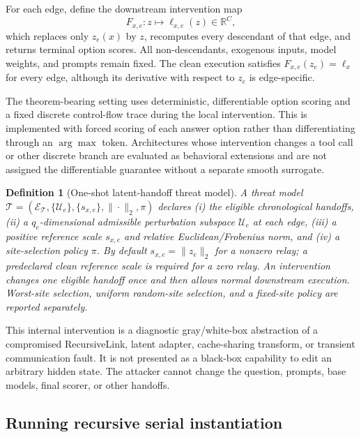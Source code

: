 \documentclass[11pt]{article}
\newtheorem{definition}[theorem]{Definition}
\newcommand{\R}{\mathbb R}
\newcommand{\threat}{\mathcal T}
\begin{document}
For each edge, define the downstream intervention map
\begin{equation}
    F_{x,e}:z\longmapsto \ell_{x,e}(z)\in\R^C,
    \label{eq:intervention-map}
\end{equation}
which replaces only \(z_e(x)\) by \(z\), recomputes every descendant of that
edge, and returns terminal option scores. All non-descendants, exogenous inputs,
model weights, and prompts remain fixed. The clean execution satisfies
\(F_{x,e}(z_e)=\ell_x\) for every edge, although its derivative with respect to
\(z_e\) is edge-specific.

The theorem-bearing setting uses deterministic, differentiable option scoring
and a fixed discrete control-flow trace during the local intervention. This is
implemented with forced scoring of each answer option rather than differentiating
through an \(\arg\max\) token. Architectures whose intervention changes a tool
call or other discrete branch are evaluated as behavioral extensions and are
not assigned the differentiable guarantee without a separate smooth surrogate.

\begin{definition}[One-shot latent-handoff threat model]
\label{def:threat-model}
A threat model
\(\threat=(\mathcal E_{\threat},\{\mathcal U_e\},\{s_{x,e}\},
\|\cdot\|_2,\pi)\)
declares (i) the eligible chronological handoffs,
(ii) a \(q_e\)-dimensional admissible perturbation subspace
\(\mathcal U_e\) at each edge, (iii) a positive reference scale \(s_{x,e}\)
and relative Euclidean/Frobenius norm, and (iv) a site-selection policy \(\pi\).
By default \(s_{x,e}=\|z_e\|_2\) for a nonzero relay; a predeclared clean
reference scale is required for a zero relay. An intervention changes one
eligible handoff once and then allows normal downstream execution. Worst-site
selection, uniform random-site selection, and a fixed-site policy are reported
separately.
\end{definition}

This internal intervention is a diagnostic gray/white-box abstraction of a
compromised RecursiveLink, latent adapter, cache-sharing transform, or transient
communication fault. It is not presented as a black-box capability to edit an
arbitrary hidden state. The attacker cannot change the question, prompts, base
models, final scorer, or other handoffs.

\subsection{Running recursive serial instantiation}
\end{document}
